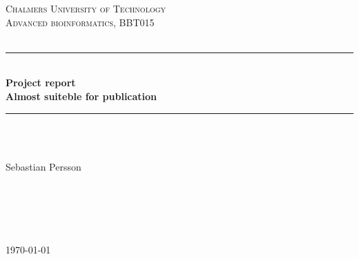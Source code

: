 \documentclass[a4paper]{article}
\begin{document}
\thispagestyle{empty}


\newcommand{\HRule}{\rule{\linewidth}{0.5mm}} %

\begin{center} %
 

\textsc{\LARGE Chalmers University of Technology}\\[1.5cm] %
\textsc{\Large Advanced bioinformatics, BBT015}\\[0.5cm] %

\textsc{\Large }\\[0.5cm] %

\HRule \\[0.8cm]
{ \huge \bfseries Project report 
 }\\[0.8cm] 
\Large \bfseries Almost suiteble for publication 
\HRule \\[0.8cm]


 

\begin{minipage}[t]{0.4\textwidth}
\begin{flushleft} \large
\emph{}\\
Sebastian Persson

\end{flushleft}
\end{minipage}
~
\begin{minipage}[t]{0.4\textwidth}
\begin{flushright} \large
\emph{}\\
\bigskip
\end{flushright}
\end{minipage}\\[2cm]


{\large \today}\\[2cm] 



\vfill %
\end{center}

\newpage

\pagebreak
\tableofcontents
\pagebreak
{} 

\end{document}
